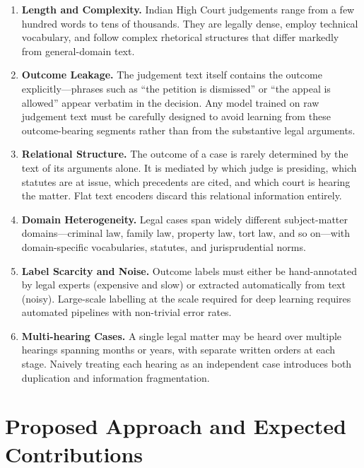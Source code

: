 \documentclass[12pt,a4paper]{report}
\begin{document}
\begin{enumerate}[label=\textbf{C\arabic*.}, leftmargin=2.5em]
  \item \textbf{Length and Complexity.} Indian High Court judgements range from a few hundred words to tens of thousands. They are legally dense, employ technical vocabulary, and follow complex rhetorical structures that differ markedly from general-domain text.

  \item \textbf{Outcome Leakage.} The judgement text itself contains the outcome explicitly---phrases such as ``the petition is dismissed'' or ``the appeal is allowed'' appear verbatim in the decision. Any model trained on raw judgement text must be carefully designed to avoid learning from these outcome-bearing segments rather than from the substantive legal arguments.

  \item \textbf{Relational Structure.} The outcome of a case is rarely determined by the text of its arguments alone. It is mediated by which judge is presiding, which statutes are at issue, which precedents are cited, and which court is hearing the matter. Flat text encoders discard this relational information entirely.

  \item \textbf{Domain Heterogeneity.} Legal cases span widely different subject-matter domains---criminal law, family law, property law, tort law, and so on---with domain-specific vocabularies, statutes, and jurisprudential norms.

  \item \textbf{Label Scarcity and Noise.} Outcome labels must either be hand-annotated by legal experts (expensive and slow) or extracted automatically from text (noisy). Large-scale labelling at the scale required for deep learning requires automated pipelines with non-trivial error rates.

  \item \textbf{Multi-hearing Cases.} A single legal matter may be heard over multiple hearings spanning months or years, with separate written orders at each stage. Naively treating each hearing as an independent case introduces both duplication and information fragmentation.
\end{enumerate}

\section{Proposed Approach and Expected Contributions}
\label{sec:proposed_approach}
\end{document}

